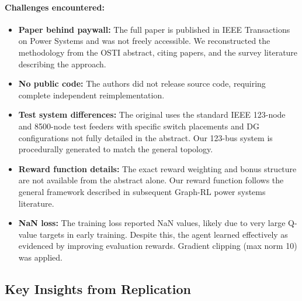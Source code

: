\documentclass[11pt]{article}
\begin{document}
\paragraph{Challenges encountered:}
\begin{itemize}[leftmargin=*]
    \item \textbf{Paper behind paywall:} The full paper is published in IEEE Transactions on Power Systems and was not freely accessible. We reconstructed the methodology from the OSTI abstract, citing papers, and the survey literature describing the approach.
    \item \textbf{No public code:} The authors did not release source code, requiring complete independent reimplementation.
    \item \textbf{Test system differences:} The original uses the standard IEEE 123-node and 8500-node test feeders with specific switch placements and DG configurations not fully detailed in the abstract. Our 123-bus system is procedurally generated to match the general topology.
    \item \textbf{Reward function details:} The exact reward weighting and bonus structure are not available from the abstract alone. Our reward function follows the general framework described in subsequent Graph-RL power systems literature.
    \item \textbf{NaN loss:} The training loss reported NaN values, likely due to very large Q-value targets in early training. Despite this, the agent learned effectively as evidenced by improving evaluation rewards. Gradient clipping (max norm 10) was applied.
\end{itemize}

\subsection{Key Insights from Replication}
\end{document}
